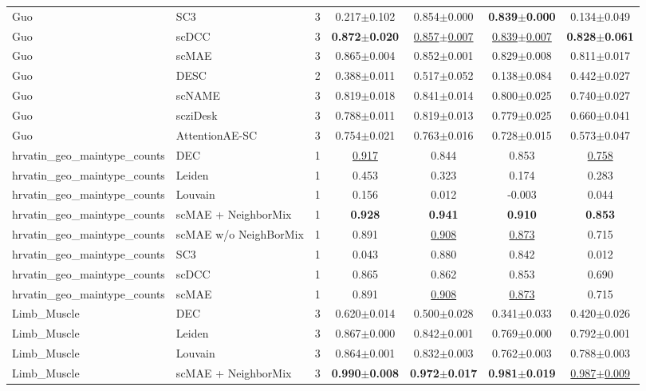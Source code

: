 \begin{table}[t]
\begin{tabular}{llrcccc}
Guo & SC3 & 3 & 0.217$\pm$0.102 & 0.854$\pm$0.000 & \textbf{0.839$\pm$0.000} & 0.134$\pm$0.049 \\
Guo & scDCC & 3 & \textbf{0.872$\pm$0.020} & \underline{0.857$\pm$0.007} & \underline{0.839$\pm$0.007} & \textbf{0.828$\pm$0.061} \\
Guo & scMAE & 3 & 0.865$\pm$0.004 & 0.852$\pm$0.001 & 0.829$\pm$0.008 & 0.811$\pm$0.017 \\
Guo & DESC & 2 & 0.388$\pm$0.011 & 0.517$\pm$0.052 & 0.138$\pm$0.084 & 0.442$\pm$0.027 \\
Guo & scNAME & 3 & 0.819$\pm$0.018 & 0.841$\pm$0.014 & 0.800$\pm$0.025 & 0.740$\pm$0.027 \\
Guo & scziDesk & 3 & 0.788$\pm$0.011 & 0.819$\pm$0.013 & 0.779$\pm$0.025 & 0.660$\pm$0.041 \\
Guo & AttentionAE-SC & 3 & 0.754$\pm$0.021 & 0.763$\pm$0.016 & 0.728$\pm$0.015 & 0.573$\pm$0.047 \\
\midrule
hrvatin\_geo\_maintype\_counts & DEC & 1 & \underline{0.917} & 0.844 & 0.853 & \underline{0.758} \\
hrvatin\_geo\_maintype\_counts & Leiden & 1 & 0.453 & 0.323 & 0.174 & 0.283 \\
hrvatin\_geo\_maintype\_counts & Louvain & 1 & 0.156 & 0.012 & -0.003 & 0.044 \\
hrvatin\_geo\_maintype\_counts & scMAE + NeighborMix & 1 & \textbf{0.928} & \textbf{0.941} & \textbf{0.910} & \textbf{0.853} \\
hrvatin\_geo\_maintype\_counts & scMAE w/o NeighBorMix & 1 & 0.891 & \underline{0.908} & \underline{0.873} & 0.715 \\
hrvatin\_geo\_maintype\_counts & SC3 & 1 & 0.043 & 0.880 & 0.842 & 0.012 \\
hrvatin\_geo\_maintype\_counts & scDCC & 1 & 0.865 & 0.862 & 0.853 & 0.690 \\
hrvatin\_geo\_maintype\_counts & scMAE & 1 & 0.891 & \underline{0.908} & \underline{0.873} & 0.715 \\
\midrule
Limb\_Muscle & DEC & 3 & 0.620$\pm$0.014 & 0.500$\pm$0.028 & 0.341$\pm$0.033 & 0.420$\pm$0.026 \\
Limb\_Muscle & Leiden & 3 & 0.867$\pm$0.000 & 0.842$\pm$0.001 & 0.769$\pm$0.000 & 0.792$\pm$0.001 \\
Limb\_Muscle & Louvain & 3 & 0.864$\pm$0.001 & 0.832$\pm$0.003 & 0.762$\pm$0.003 & 0.788$\pm$0.003 \\
Limb\_Muscle & scMAE + NeighborMix & 3 & \textbf{0.990$\pm$0.008} & \textbf{0.972$\pm$0.017} & \textbf{0.981$\pm$0.019} & \underline{0.987$\pm$0.009} \\

\end{tabular}
\end{table}
